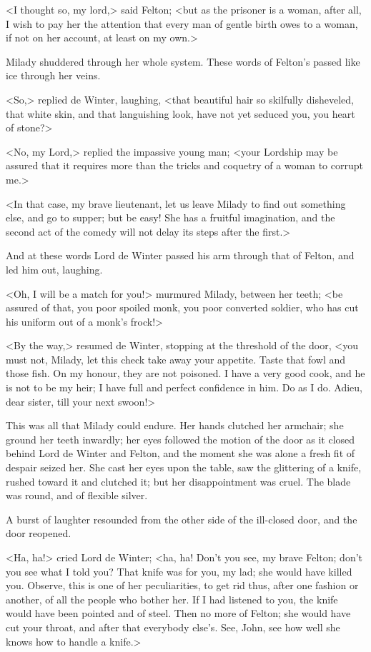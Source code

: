 <I thought so, my lord,> said Felton; <but as the prisoner is a woman, after all, I wish to pay her the attention that every man of gentle birth owes to a woman, if not on her account, at least on my own.> 

Milady shuddered through her whole system. These words of Felton's passed like ice through her veins. 

<So,> replied de Winter, laughing, <that beautiful hair so skilfully disheveled, that white skin, and that languishing look, have not yet seduced you, you heart of stone?> 

<No, my Lord,> replied the impassive young man; <your Lordship may be assured that it requires more than the tricks and coquetry of a woman to corrupt me.> 

<In that case, my brave lieutenant, let us leave Milady to find out something else, and go to supper; but be easy! She has a fruitful imagination, and the second act of the comedy will not delay its steps after the first.> 

And at these words Lord de Winter passed his arm through that of Felton, and led him out, laughing. 

<Oh, I will be a match for you!> murmured Milady, between her teeth; <be assured of that, you poor spoiled monk, you poor converted soldier, who has cut his uniform out of a monk's frock!> 

<By the way,> resumed de Winter, stopping at the threshold of the door, <you must not, Milady, let this check take away your appetite. Taste that fowl and those fish. On my honour, they are not poisoned. I have a very good cook, and he is not to be my heir; I have full and perfect confidence in him. Do as I do. Adieu, dear sister, till your next swoon!> 

This was all that Milady could endure. Her hands clutched her armchair; she ground her teeth inwardly; her eyes followed the motion of the door as it closed behind Lord de Winter and Felton, and the moment she was alone a fresh fit of despair seized her. She cast her eyes upon the table, saw the glittering of a knife, rushed toward it and clutched it; but her disappointment was cruel. The blade was round, and of flexible silver. 

A burst of laughter resounded from the other side of the ill-closed door, and the door reopened. 

<Ha, ha!> cried Lord de Winter; <ha, ha! Don't you see, my brave Felton; don't you see what I told you? That knife was for you, my lad; she would have killed you. Observe, this is one of her peculiarities, to get rid thus, after one fashion or another, of all the people who bother her. If I had listened to you, the knife would have been pointed and of steel. Then no more of Felton; she would have cut your throat, and after that everybody else's. See, John, see how well she knows how to handle a knife.> 

